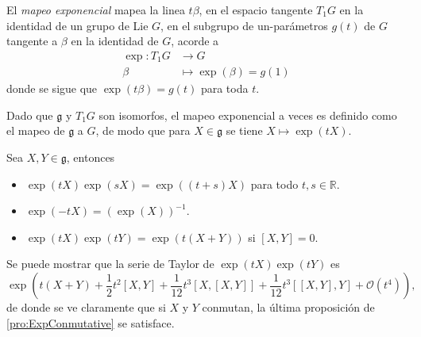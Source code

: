 \begin{mydef} \cite{Warner}
El \emph{mapeo exponencial} mapea la linea $t \beta$, en el espacio tangente $T_{1} G$ en la identidad de un grupo de Lie $G$, en el subgrupo de un-par\'{a}metros $g (t)$ de $G$ tangente a $\beta$ en la identidad de $G$, acorde a
%
\begin{align*}
\exp: T_{1} G & \longrightarrow G \\
\beta & \longmapsto \exp (\beta) = g (1)
\end{align*}
%
donde se sigue que $\exp (t \beta) = g (t)$ para toda $t$.
\end{mydef}

\begin{obs} \cite{Warner}
Dado que $\mathfrak{g}$ y $T_{1} G$ son isomorfos, el mapeo exponencial a veces es definido como el mapeo de $\mathfrak{g}$ a $G$, de modo que para $X \in \mathfrak{g}$ se tiene $X \mapsto \exp(tX)$.
\end{obs}

\begin{pro} \cite{Warner}
\label{pro:ExpConmutative}
Sea $X, Y \in \mathfrak{g}$, entonces
%
\begin{itemize}
\item{$\exp (t X) \exp (s X) = \exp ((t + s) X)$ para todo $t, s \in \mathbb{R}$.}
\item{$\exp (-t X) = (\exp (X))^{-1}$.}
\item{$\exp (t X) \exp (t Y) = \exp (t (X + Y))$ si $[X, Y] = 0$.}
\end{itemize}
%
\end{pro}

Se puede mostrar que la serie de Taylor de $\exp (t X) \exp (t Y)$ es
%
\begin{equation*}
\exp \left( t (X + Y) + \frac{1}{2} t^{2} [X, Y] + \frac{1}{12} t^{3} [X, [X, Y]] + \frac{1}{12} t^{3} [[X, Y], Y] +\mathcal{O}(t^{4}) \right),
\end{equation*}
%
de donde se ve claramente que si $X$ y $Y$ conmutan, la \'{u}ltima proposici\'{o}n de \ref{pro:ExpConmutative} se satisface.

